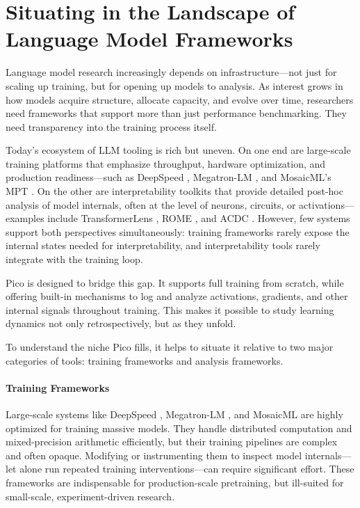\section{Situating \picolarge in the Landscape of Language Model Frameworks}
\label{sec:pico-related}

Language model research increasingly depends on infrastructure—not just for scaling up training, but for opening up models to analysis. As interest grows in how models acquire structure, allocate capacity, and evolve over time, researchers need frameworks that support more than just performance benchmarking. They need transparency into the training process itself.

Today's ecosystem of LLM tooling is rich but uneven. On one end are large-scale training platforms that emphasize throughput, hardware optimization, and production readiness—such as DeepSpeed \citep{rasley2020deepspeed}, Megatron-LM \citep{narayanan2021megatron}, and MosaicML's MPT \citep{mosaic2023mpt}. On the other are interpretability toolkits that provide detailed post-hoc analysis of model internals, often at the level of neurons, circuits, or activations—examples include TransformerLens \citep{nanda2022transformerlens}, ROME \citep{meng2022locating}, and ACDC \citep{conmy2023towards}. However, few systems support both perspectives simultaneously: training frameworks rarely expose the internal states needed for interpretability, and interpretability tools rarely integrate with the training loop.

Pico is designed to bridge this gap. It supports full training from scratch, while offering built-in mechanisms to log and analyze activations, gradients, and other internal signals throughout training. This makes it possible to study learning dynamics not only retrospectively, but as they unfold.

To understand the niche Pico fills, it helps to situate it relative to two major categories of tools: training frameworks and analysis frameworks.

\paragraph{Training Frameworks}
Large-scale systems like DeepSpeed \citep{rasley2020deepspeed}, Megatron-LM \citep{narayanan2021megatron}, and MosaicML \citep{mosaic2023mpt} are highly optimized for training massive models. They handle distributed computation and mixed-precision arithmetic efficiently, but their training pipelines are complex and often opaque. Modifying or instrumenting them to inspect model internals—let alone run repeated training interventions—can require significant effort. These frameworks are indispensable for production-scale pretraining, but ill-suited for small-scale, experiment-driven research.

